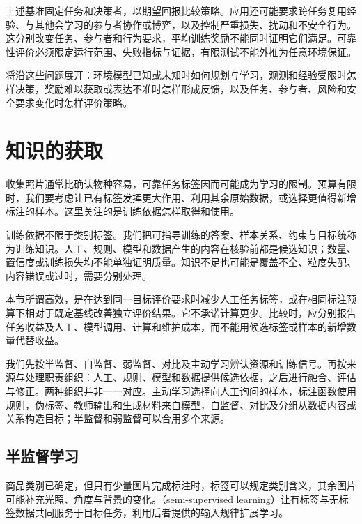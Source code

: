 上述基准固定任务和决策者，以期望回报比较策略。应用还可能要求跨任务复用经验、与其他会学习的参与者协作或博弈，以及控制严重损失、扰动和不安全行为。这分别改变任务、参与者和行为要求，平均训练奖励不能同时证明它们满足。可靠性评价必须限定运行范围、失败指标与证据，有限测试不能外推为任意环境保证。

将沿这些问题展开：环境模型已知或未知时如何规划与学习，观测和经验受限时怎样决策，奖励难以获取或表达不准时怎样形成反馈，以及任务、参与者、风险和安全要求变化时怎样评价策略。

\section{知识的获取}
\label{sec:efficient-knowledge-use-overview}

收集照片通常比确认物种容易，可靠任务标签因而可能成为学习的限制。预算有限时，我们要考虑让已有标签发挥更大作用、利用其余原始数据，或选择更值得新增标注的样本。这里关注的是训练依据怎样取得和使用。

训练依据不限于类别标签。我们把可指导训练的答案、样本关系、约束与目标统称为训练知识。人工、规则、模型和数据产生的内容在核验前都是候选知识；数量、置信度或训练损失均不能单独证明质量。知识不足也可能是覆盖不全、粒度失配、内容错误或过时，需要分别处理。

本节所谓高效，是在达到同一目标评价要求时减少人工任务标签，或在相同标注预算下相对于既定基线改善独立评价结果。它不承诺计算更少。比较时，应分别报告任务收益及人工、模型调用、计算和维护成本，而不能用候选标签或样本的新增数量代替收益。

我们先按半监督、自监督、弱监督、对比及主动学习辨认资源和训练信号。再按来源与处理职责组织：人工、规则、模型和数据提供候选依据，之后进行融合、评估与修正。两种组织并非一一对应。主动学习选择向人工询问的样本，标注函数使用规则，伪标签、教师输出和生成材料来自模型，自监督、对比及分组从数据内容或关系构造目标；半监督和弱监督可以合用多个来源。

\subsection{半监督学习}
\label{sec:semi-supervised-learning}

商品类别已确定，但只有少量图片完成标注时，标签可以规定类别含义，其余图片可能补充光照、角度与背景的变化。（semi-supervised learning）让有标签与无标签数据共同服务于目标任务，利用后者提供的输入规律扩展学习。

